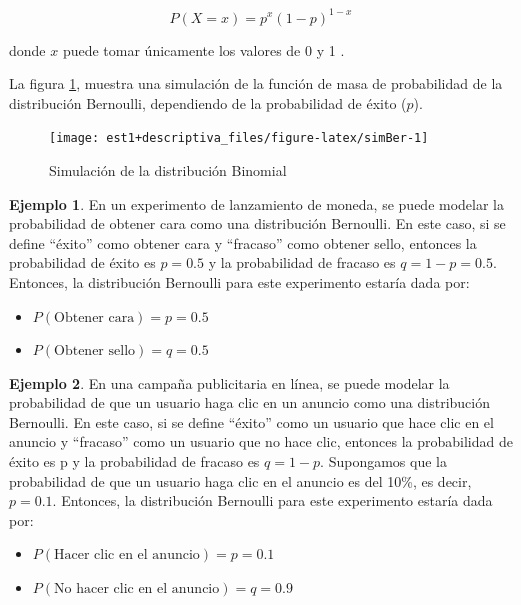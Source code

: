 \documentclass[
  11pt,
]{book}
\providecommand{\tightlist}{%
  \setlength{\itemsep}{0pt}\setlength{\parskip}{0pt}}
\theoremstyle{definition}
\theoremstyle{definition}
\newtheorem{example}{Ejemplo}[chapter]
\theoremstyle{definition}
\theoremstyle{definition}
\theoremstyle{remark}
\begin{document}
\begin{equation}
P(X = x) = p^x(1-p)^{1-x}
\label{eq:bernoulli}
\end{equation}

donde \(x\) puede tomar únicamente los valores de 0 y 1 \citep[página 105]{larsen}.

La figura \ref{fig:simBer}, muestra una simulación de la función de masa de probabilidad de la distribución Bernoulli, dependiendo de la probabilidad de éxito (\(p\)).

\begin{figure}

{\centering \texttt{[image: est1+descriptiva\_files/figure-latex/simBer-1]} 

}

\caption{Simulación de la distribución Binomial}\label{fig:simBer}
\end{figure}

\begin{example}

En un experimento de lanzamiento de moneda, se puede modelar la probabilidad de obtener cara como una distribución Bernoulli. En este caso, si se define ``éxito'' como obtener cara y ``fracaso'' como obtener sello, entonces la probabilidad de éxito es \(p = 0.5\) y la probabilidad de fracaso es \(q = 1 - p = 0.5\). Entonces, la distribución Bernoulli para este experimento estaría dada por:

\begin{itemize}
\tightlist
\item
  \(P(\text{Obtener cara}) = p = 0.5\)
\item
  \(P(\text{Obtener sello}) = q = 0.5\)
\end{itemize}

\end{example}

\begin{example}

En una campaña publicitaria en línea, se puede modelar la probabilidad de que un usuario haga clic en un anuncio como una distribución Bernoulli. En este caso, si se define ``éxito'' como un usuario que hace clic en el anuncio y ``fracaso'' como un usuario que no hace clic, entonces la probabilidad de éxito es p y la probabilidad de fracaso es \(q = 1 - p\). Supongamos que la probabilidad de que un usuario haga clic en el anuncio es del 10\%, es decir, \(p = 0.1\). Entonces, la distribución Bernoulli para este experimento estaría dada por:

\begin{itemize}
\tightlist
\item
  \(P(\text{Hacer clic en el anuncio}) = p = 0.1\)
\item
  \(P(\text{No hacer clic en el anuncio}) = q = 0.9\)
\end{itemize}

\end{example}
\end{document}
